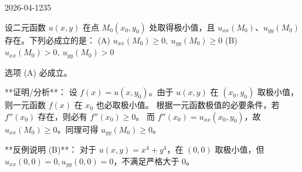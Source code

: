 \begin{mistake}{2026-04-12}{35}

\begin{problemcontent}
设二元函数 \( u(x,y) \) 在点 \( M_0(x_0,y_0) \) 处取得极小值，且 \( u_{xx}(M_0) \)、\( u_{yy}(M_0) \) 存在。下列必成立的是：
(A) \( u_{xx}(M_0)\ge0,\ u_{yy}(M_0)\ge0 \)
(B) \( u_{xx}(M_0)>0,\ u_{yy}(M_0)>0 \)
\end{problemcontent}

\begin{solutioncontent}
选项 (A) 必成立。

**证明/分析**：
设 \( f(x) = u(x, y_0) \)。由于 \( u(x,y) \) 在 \( (x_0,y_0) \) 取极小值，则一元函数 \( f(x) \) 在 \( x_0 \) 也必取极小值。
根据一元函数极值的必要条件，若 \( f''(x_0) \) 存在，则必有 \( f''(x_0) \ge 0 \)。
而 \( f''(x_0) = u_{xx}(x_0, y_0) \)，故 \( u_{xx}(M_0) \ge 0 \)。同理可得 \( u_{yy}(M_0) \ge 0 \)。

**反例说明 (B)**：
对于 \( u(x,y) = x^4 + y^4 \)，在 \( (0,0) \) 取极小值，但 \( u_{xx}(0,0)=0, u_{yy}(0,0)=0 \)，不满足严格大于 0。
\end{solutioncontent}


\end{mistake}
